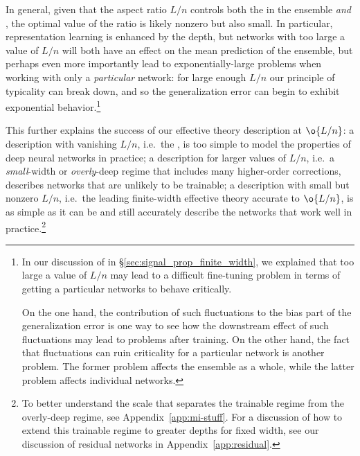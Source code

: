 In general, given that the aspect ratio $L/n$ controls both the  in the ensemble \emph{and} , the optimal value of the ratio is likely nonzero but also small. In particular, representation learning is enhanced by the depth, but networks with too large a value of $L/n$ will both have an effect on the mean prediction of the ensemble, but perhaps even more importantly lead to exponentially-large problems when working with only a \emph{particular} network: for large enough $L/n$ our principle of typicality can break down, and so the generalization error can begin to exhibit exponential behavior.\footnote{In our discussion of  in  \S\ref{sec:signal_prop_finite_width}, we explained that too large a value of $L/n$ may lead to a difficult fine-tuning problem in terms of getting a particular networks to behave critically.

On the one hand, the contribution of such fluctuations to the bias part of the generalization error is one way to see how the downstream effect of such fluctuations may lead to problems after training. On the other hand, the fact that fluctuations can ruin criticality for a particular network is another problem. The former problem affects the ensemble as a whole, while the latter problem affects individual networks.}

This further explains the success of our effective theory description at $\o{L/n}$: a description with vanishing $L/n$, i.e.~the , is too simple to model the properties of deep neural networks in practice; a description for larger values of $L/n$, i.e.~a \emph{small}-width or \emph{overly}-deep regime that includes many higher-order corrections, describes networks that are unlikely to be trainable; a description with small but nonzero $L/n$, i.e.~the leading finite-width effective theory accurate to $\o{L/n}$, is as simple as it can be and still accurately describe the networks that work well in practice.\footnote{
    To better understand the scale that separates the trainable regime from the overly-deep regime, see Appendix~\ref{app:mi-stuff}.
    For a discussion of how to extend this trainable regime to greater depths for fixed width, see our discussion of residual networks in Appendix~\ref{app:residual}.
}

